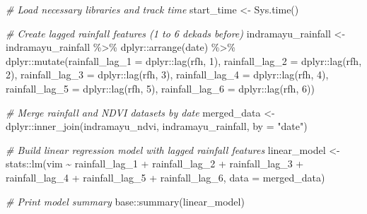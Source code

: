 \documentclass[
]{article}
\newenvironment{Shaded}{}{}
\newcommand{\AttributeTok}[1]{\textcolor[rgb]{0.49,0.56,0.16}{#1}}
\newcommand{\CommentTok}[1]{\textcolor[rgb]{0.38,0.63,0.69}{\textit{#1}}}
\newcommand{\DecValTok}[1]{\textcolor[rgb]{0.25,0.63,0.44}{#1}}
\newcommand{\FunctionTok}[1]{\textcolor[rgb]{0.02,0.16,0.49}{#1}}
\newcommand{\NormalTok}[1]{#1}
\newcommand{\OtherTok}[1]{\textcolor[rgb]{0.00,0.44,0.13}{#1}}
\newcommand{\SpecialCharTok}[1]{\textcolor[rgb]{0.25,0.44,0.63}{#1}}
\newcommand{\StringTok}[1]{\textcolor[rgb]{0.25,0.44,0.63}{#1}}
\begin{document}
\begin{Shaded}
\begin{Highlighting}[]
\CommentTok{\# Load necessary libraries and track time}
\NormalTok{start\_time }\OtherTok{\textless{}{-}} \FunctionTok{Sys.time}\NormalTok{()}

\CommentTok{\# Create lagged rainfall features (1 to 6 dekads before)}
\NormalTok{indramayu\_rainfall }\OtherTok{\textless{}{-}}\NormalTok{ indramayu\_rainfall }\SpecialCharTok{\%\textgreater{}\%}
\NormalTok{  dplyr}\SpecialCharTok{::}\FunctionTok{arrange}\NormalTok{(date) }\SpecialCharTok{\%\textgreater{}\%}
\NormalTok{  dplyr}\SpecialCharTok{::}\FunctionTok{mutate}\NormalTok{(}\AttributeTok{rainfall\_lag\_1 =}\NormalTok{ dplyr}\SpecialCharTok{::}\FunctionTok{lag}\NormalTok{(rfh, }\DecValTok{1}\NormalTok{),}
                \AttributeTok{rainfall\_lag\_2 =}\NormalTok{ dplyr}\SpecialCharTok{::}\FunctionTok{lag}\NormalTok{(rfh, }\DecValTok{2}\NormalTok{),}
                \AttributeTok{rainfall\_lag\_3 =}\NormalTok{ dplyr}\SpecialCharTok{::}\FunctionTok{lag}\NormalTok{(rfh, }\DecValTok{3}\NormalTok{),}
                \AttributeTok{rainfall\_lag\_4 =}\NormalTok{ dplyr}\SpecialCharTok{::}\FunctionTok{lag}\NormalTok{(rfh, }\DecValTok{4}\NormalTok{),}
                \AttributeTok{rainfall\_lag\_5 =}\NormalTok{ dplyr}\SpecialCharTok{::}\FunctionTok{lag}\NormalTok{(rfh, }\DecValTok{5}\NormalTok{),}
                \AttributeTok{rainfall\_lag\_6 =}\NormalTok{ dplyr}\SpecialCharTok{::}\FunctionTok{lag}\NormalTok{(rfh, }\DecValTok{6}\NormalTok{))}

\CommentTok{\# Merge rainfall and NDVI datasets by date}
\NormalTok{merged\_data }\OtherTok{\textless{}{-}}\NormalTok{ dplyr}\SpecialCharTok{::}\FunctionTok{inner\_join}\NormalTok{(indramayu\_ndvi, }
\NormalTok{                                 indramayu\_rainfall, }
                                 \AttributeTok{by =} \StringTok{"date"}\NormalTok{)}

\CommentTok{\# Build linear regression model with lagged rainfall features}
\NormalTok{linear\_model }\OtherTok{\textless{}{-}}\NormalTok{ stats}\SpecialCharTok{::}\FunctionTok{lm}\NormalTok{(vim }\SpecialCharTok{\textasciitilde{}}\NormalTok{ rainfall\_lag\_1 }\SpecialCharTok{+}\NormalTok{ rainfall\_lag\_2 }\SpecialCharTok{+} 
\NormalTok{                          rainfall\_lag\_3 }\SpecialCharTok{+}\NormalTok{ rainfall\_lag\_4 }\SpecialCharTok{+}\NormalTok{ rainfall\_lag\_5 }
                          \SpecialCharTok{+}\NormalTok{ rainfall\_lag\_6, }\AttributeTok{data =}\NormalTok{ merged\_data)}

\CommentTok{\# Print model summary}
\NormalTok{base}\SpecialCharTok{::}\FunctionTok{summary}\NormalTok{(linear\_model)}
\end{Highlighting}
\end{Shaded}
\end{document}
